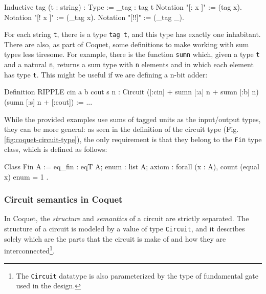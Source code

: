 \documentclass[a4paper]{article}
\begin{document}
                \begin{coqcode}
        Inductive tag (t : string) : Type := _tag : tag t
        Notation "[: x ]" := (tag x).
        Notation "[! x ]" := (_tag x).
        Notation "[!!]"   := (_tag _).
                \end{coqcode}

                For each string \texttt{t}, there is a type \texttt{tag t}, and this type has
                exactly one inhabitant. There are also, as part of Coquet, some definitions to make
                working with sum types less tiresome. For example, there is the function
                \texttt{sumn} which, given a type \texttt{t} and a natural \texttt{n}, returns a
                sum type with \texttt{n} elements and in which each element has type \texttt{t}.
                This might be useful if we are defining a n-bit adder:

                \begin{coqcode}
        Definition RIPPLE cin a b cout s n :
            Circuit  ([:cin] + sumn [:a] n + sumn [:b] n)  (sumn [:s] n + [:cout]) := ...
                \end{coqcode}

                While the provided examples use sums of tagged units as the input/output types, they
                can be more general: as seen in the definition of the circuit type (Fig.
                \ref{fig:coquet-circuit-type}), the only requirement is that they belong to the
                \texttt{Fin} type class, which is defined as follows:

                \begin{coqcode}
        Class Fin A := {
            eq_fin : eqT A;
            enum   : list A;
            axiom  : forall (x : A), count (equal x) enum = 1
        }.
                \end{coqcode}


            \subsubsection{Circuit semantics in Coquet}
            \label{subsubsec:coquet-semantics}
                In Coquet, the \emph{structure} and \emph{semantics} of a circuit are strictly
                separated. The structure of a circuit is modeled by a value of type
                \texttt{Circuit}, and it describes solely which are the parts that the circuit is
                make of and how they are interconnected\footnote{The \texttt{Circuit} datatype is
                    also parameterized by the type of fundamental gate used in the design.}.
\end{document}
